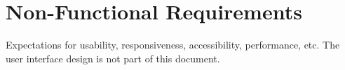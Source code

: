 \section{Non-Functional Requirements}
Expectations for usability, responsiveness, accessibility, performance, etc. The user interface design is not part of this document.